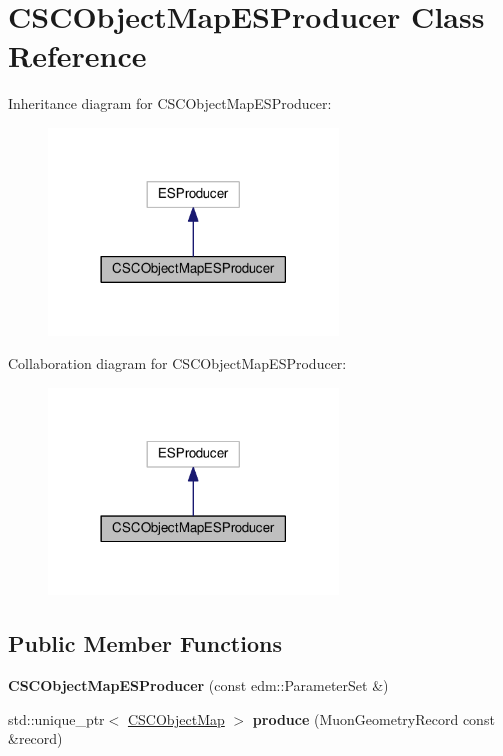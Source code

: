 \hypertarget{classCSCObjectMapESProducer}{\section{C\-S\-C\-Object\-Map\-E\-S\-Producer Class Reference}
\label{classCSCObjectMapESProducer}
}


Inheritance diagram for C\-S\-C\-Object\-Map\-E\-S\-Producer\-:
\nopagebreak
\begin{figure}[H]
\begin{center}
\leavevmode
\includegraphics[width=218pt]{classCSCObjectMapESProducer__inherit__graph}
\end{center}
\end{figure}


Collaboration diagram for C\-S\-C\-Object\-Map\-E\-S\-Producer\-:
\nopagebreak
\begin{figure}[H]
\begin{center}
\leavevmode
\includegraphics[width=218pt]{classCSCObjectMapESProducer__coll__graph}
\end{center}
\end{figure}
\subsection*{Public Member Functions}
\begin{DoxyCompactItemize}
\item 
\hypertarget{classCSCObjectMapESProducer_a70839fe6ad669166ad2540aa319e9c9c}{{\bfseries C\-S\-C\-Object\-Map\-E\-S\-Producer} (const edm\-::\-Parameter\-Set \&)}\label{classCSCObjectMapESProducer_a70839fe6ad669166ad2540aa319e9c9c}

\item 
\hypertarget{classCSCObjectMapESProducer_a6381047870aeef64579d92f34d69ba9c}{std\-::unique\-\_\-ptr$<$ \hyperlink{classCSCObjectMap}{C\-S\-C\-Object\-Map} $>$ {\bfseries produce} (Muon\-Geometry\-Record const \&record)}\label{classCSCObjectMapESProducer_a6381047870aeef64579d92f34d69ba9c}

\end{DoxyCompactItemize}
